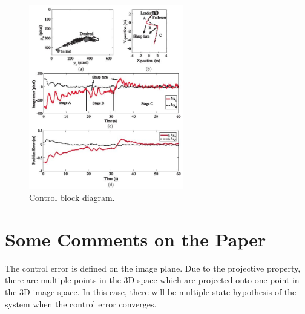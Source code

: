 \documentclass[12pt,a4paper]{article}
\begin{document}
\begin{figure}
  \centering
  \includegraphics[width=0.6\textwidth]{figs/result2.jpg}%
  \caption{Control block diagram.}
  \label{result2}
\end{figure}

\section{Some Comments on the Paper}

\indent The control error is defined on the image plane. Due to the projective property, there are multiple points in the 3D space which are projected onto one point in the 3D image space. In this case, there will be multiple state hypothesis of the system when the control error converges.


\end{document}
